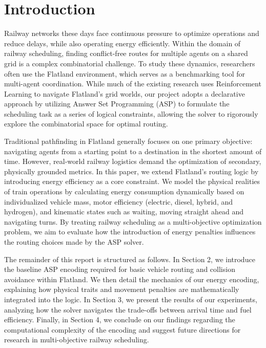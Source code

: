 \section{Introduction}
Railway networks these days face continuous pressure to optimize operations and reduce delays, while also operating energy efficiently. Within the domain of railway scheduling, finding conflict-free routes for multiple agents on a shared grid is a complex combinatorial challenge. To study these dynamics, researchers often use the Flatland environment, which serves as a benchmarking tool for multi-agent coordination. While much of the existing research uses Reinforcement Learning to navigate Flatland's grid worlds, our project adopts a declarative approach by utilizing Answer Set Programming (ASP) to formulate the scheduling task as a series of logical constraints, allowing the solver to rigorously explore the combinatorial space for optimal routing.

Traditional pathfinding in Flatland generally focuses on one primary objective: navigating agents from a starting point to a destination in the shortest amount of time. However, real-world railway logistics demand the optimization of secondary, physically grounded metrics. In this paper, we extend Flatland's routing logic by introducing energy efficiency as a core constraint. We model the physical realities of train operations by calculating energy consumption dynamically based on individualized vehicle mass, motor efficiency (electric, diesel, hybrid, and hydrogen), and kinematic states such as waiting, moving straight ahead and navigating turns. By treating railway scheduling as a multi-objective optimization problem, we aim to evaluate how the introduction of energy penalties influences the routing choices made by the ASP solver. 

The remainder of this report is structured as follows. In Section 2, we introduce the baseline ASP encoding required for basic vehicle routing and collision avoidance within Flatland. We then detail the mechanics of our energy encoding, explaining how physical traits and movement penalties are mathematically integrated into the logic. In Section 3, we present the results of our experiments, analyzing how the solver navigates the trade-offs between arrival time and fuel efficiency. Finally, in Section 4, we conclude on our findings regarding the computational complexity of the encoding and suggest future directions for research in multi-objective railway scheduling.